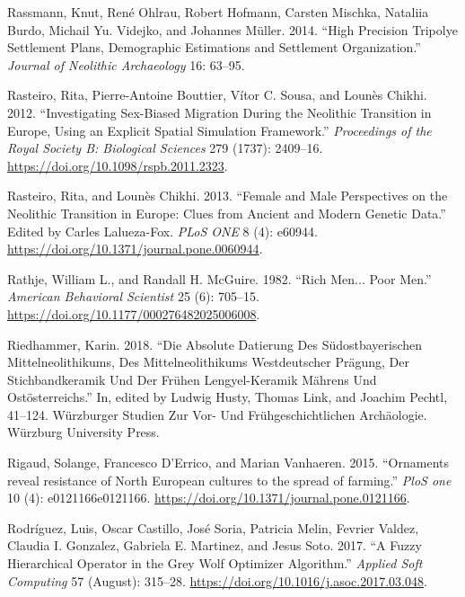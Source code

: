 \documentclass[
  12pt,
  a4paper, twoside]{book}
\newlength{\cslhangindent}
\newlength{\cslentryspacingunit} %
\newenvironment{CSLReferences}[2] %
 {%
  \setlength{\parindent}{0pt}
  \ifodd #1
  \let\oldpar\par
  \def\par{\hangindent=\cslhangindent\oldpar}
  \fi
  \setlength{\parskip}{#2\cslentryspacingunit}
 }%
 {}
\begin{document}
\begin{CSLReferences}{1}{0}
\leavevmode{}%
Rassmann, Knut, René Ohlrau, Robert Hofmann, Carsten Mischka, Nataliia Burdo, Michail Yu. Videjko, and Johannes Müller. 2014. {``High Precision Tripolye Settlement Plans, Demographic Estimations and Settlement Organization.''} \emph{Journal of Neolithic Archaeology} 16: 63--95.

\leavevmode{}%
Rasteiro, Rita, Pierre-Antoine Bouttier, Vítor C. Sousa, and Lounès Chikhi. 2012. {``Investigating Sex-Biased Migration During the Neolithic Transition in Europe, Using an Explicit Spatial Simulation Framework.''} \emph{Proceedings of the Royal Society B: Biological Sciences} 279 (1737): 2409--16. \url{https://doi.org/10.1098/rspb.2011.2323}.

\leavevmode{}%
Rasteiro, Rita, and Lounès Chikhi. 2013. {``Female and Male Perspectives on the Neolithic Transition in Europe: Clues from Ancient and Modern Genetic Data.''} Edited by Carles Lalueza-Fox. \emph{PLoS ONE} 8 (4): e60944. \url{https://doi.org/10.1371/journal.pone.0060944}.

\leavevmode{}%
Rathje, William L., and Randall H. McGuire. 1982. {``Rich Men... Poor Men.''} \emph{American Behavioral Scientist} 25 (6): 705--15. \url{https://doi.org/10.1177/000276482025006008}.

\leavevmode{}%
Riedhammer, Karin. 2018. {``Die Absolute Datierung Des Südostbayerischen Mittelneolithikums, Des Mittelneolithikums Westdeutscher Prägung, Der Stichbandkeramik Und Der Frühen Lengyel-Keramik Mährens Und Ostösterreichs.''} In, edited by Ludwig Husty, Thomas Link, and Joachim Pechtl, 41--124. Würzburger Studien Zur Vor- Und Frühgeschichtlichen Archäologie. Würzburg University Press.

\leavevmode{}%
Rigaud, Solange, Francesco D'Errico, and Marian Vanhaeren. 2015. {``Ornaments reveal resistance of North European cultures to the spread of farming.''} \emph{PloS one} 10 (4): e0121166e0121166. \url{https://doi.org/10.1371/journal.pone.0121166}.

\leavevmode{}%
Rodríguez, Luis, Oscar Castillo, José Soria, Patricia Melin, Fevrier Valdez, Claudia I. Gonzalez, Gabriela E. Martinez, and Jesus Soto. 2017. {``A Fuzzy Hierarchical Operator in the Grey Wolf Optimizer Algorithm.''} \emph{Applied Soft Computing} 57 (August): 315--28. \url{https://doi.org/10.1016/j.asoc.2017.03.048}.


\end{CSLReferences}
\end{document}
